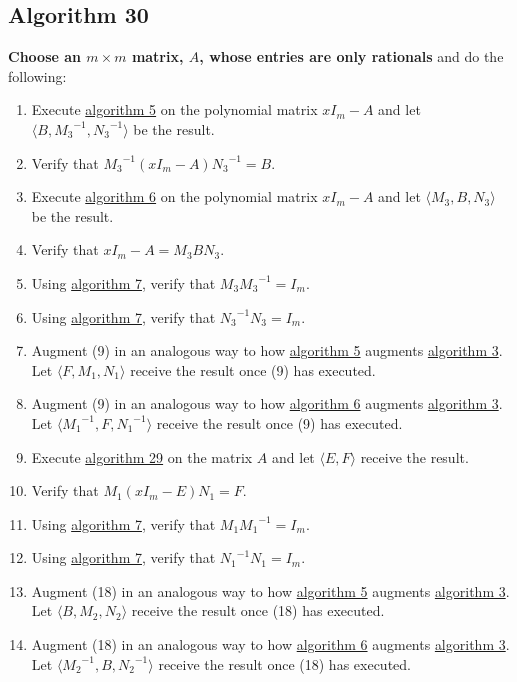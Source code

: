 \documentclass[twocolumn]{article}
\begin{document}
		\subsection{Algorithm 30}\label{sec:algorithm 30}
			\textbf{Choose an $m\times m$ matrix, $A$, whose entries are only rationals} and do the following:
			\begin{enumerate}
				\item Execute \hyperref[sec:algorithm 5]{algorithm 5} on the polynomial matrix $xI_m-A$ and let $\langle B,{M_3}^{-1},{N_3}^{-1}\rangle$ be the result.
				\item Verify that ${M_3}^{-1}(xI_m-A){N_3}^{-1}=B$.
				\item Execute \hyperref[sec:algorithm 6]{algorithm 6} on the polynomial matrix $xI_m-A$ and let $\langle M_3,B,N_3\rangle$ be the result.
				\item Verify that $xI_m-A=M_3BN_3$.
				\item Using \hyperref[sec:algorithm 7]{algorithm 7}, verify that $M_3{M_3}^{-1}=I_m$.
				\item Using \hyperref[sec:algorithm 7]{algorithm 7}, verify that ${N_3}^{-1}N_3=I_m$.
				\item Augment (9) in an analogous way to how \hyperref[sec:algorithm 5]{algorithm 5} augments \hyperref[sec:algorithm 3]{algorithm 3}. Let $\langle F,M_1,N_1\rangle$ receive the result once (9) has executed.
				\item Augment (9) in an analogous way to how \hyperref[sec:algorithm 6]{algorithm 6} augments \hyperref[sec:algorithm 3]{algorithm 3}. Let $\langle {M_1}^{-1},F,{N_1}^{-1}\rangle$ receive the result once (9) has executed.
				\item Execute \hyperref[sec:algorithm 29]{algorithm 29} on the matrix $A$ and let $\langle E,F\rangle$ receive the result.
				\item Verify that $M_1(xI_m-E)N_1=F$.
				\item Using \hyperref[sec:algorithm 7]{algorithm 7}, verify that $M_1{M_1}^{-1}=I_m$.
				\item Using \hyperref[sec:algorithm 7]{algorithm 7}, verify that ${N_1}^{-1}N_1=I_m$.
				\item Augment (18) in an analogous way to how \hyperref[sec:algorithm 5]{algorithm 5} augments \hyperref[sec:algorithm 3]{algorithm 3}. Let $\langle B,M_2,N_2\rangle$ receive the result once (18) has executed.
				\item Augment (18) in an analogous way to how \hyperref[sec:algorithm 6]{algorithm 6} augments \hyperref[sec:algorithm 3]{algorithm 3}. Let $\langle {M_2}^{-1},B,{N_2}^{-1}\rangle$ receive the result once (18) has executed.

\end{enumerate}
\end{document}
